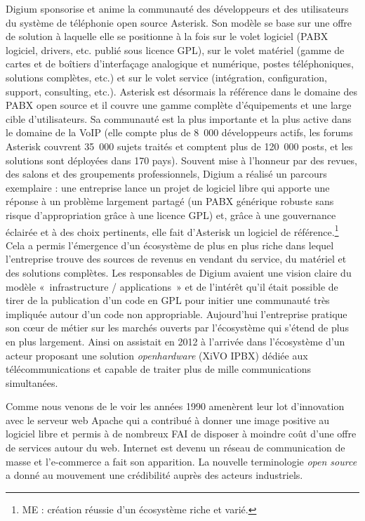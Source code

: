 \documentclass{FramateX}
\begin{document}
\begin{refsection}
Digium sponsorise et anime la communauté des développeurs et des
utilisateurs du système de téléphonie open source Asterisk. Son modèle
se base sur une offre de solution à laquelle elle se positionne à la
fois sur le volet logiciel (PABX logiciel, drivers, etc. publié sous
licence GPL), sur le volet matériel (gamme de cartes et de boîtiers
d'interfaçage analogique et numérique, postes téléphoniques, solutions
complètes, etc.) et sur le volet service (intégration, configuration,
support, consulting, etc.). Asterisk est désormais la référence dans le
domaine des PABX open source et il couvre une gamme complète
d'équipements et une large cible d'utilisateurs. Sa communauté est la
plus importante et la plus active dans le domaine de la VoIP (elle
compte plus de 8~000 développeurs actifs, les forums Asterisk couvrent
35~000 sujets traités et comptent plus de 120~000 posts, et les
solutions sont déployées dans 170 pays). Souvent mise à
l'honneur par des revues, des salons et des
groupements professionnels, Digium a réalisé un parcours exemplaire :
une entreprise lance un projet de logiciel libre qui apporte une
réponse à un problème largement partagé (un PABX générique robuste sans
risque d'appropriation grâce à une licence GPL) et, grâce à une
gouvernance éclairée et à des choix pertinents, elle fait d'Asterisk un
logiciel de référence.\footnote{ME : création réussie
d'un écosystème riche et varié.} Cela a permis
l'émergence d'un écosystème de plus en plus riche dans lequel
l'entreprise trouve des sources de revenus en vendant du service, du
matériel et des solutions complètes. Les responsables de Digium avaient
une vision claire du modèle «~infrastructure / applications~» et de
l'intérêt qu'il était possible de tirer de la
publication d'un code en GPL pour initier une communauté très impliquée
autour d'un code non appropriable. Aujourd'hui l'entreprise pratique
son cœur de métier sur les marchés ouverts par l'écosystème qui s'étend
de plus en plus largement. Ainsi on assistait en 2012 à l'arrivée dans
l'écosystème d'un acteur proposant une solution \textit{openhardware} (XiVO
IPBX) dédiée aux télécommunications et capable de traiter plus de mille
communications simultanées.

Comme nous venons de le voir les années 1990 amenèrent leur lot
d'innovation avec le serveur web Apache qui a
contribué à donner une image positive au logiciel libre et permis à de
nombreux FAI de disposer à moindre coût d'une offre de services autour
du web. Internet est devenu un réseau de communication de masse et
l'e-commerce a fait son apparition. La nouvelle
terminologie \textit{open source} a donné au mouvement une
crédibilité auprès des acteurs industriels.


\end{refsection}
\end{document}

